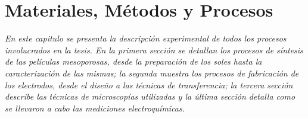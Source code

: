  \newcommand{\NoBiblioMat}[1]{
 \ifthenelse{\equal{#1}{verdadero}}{}{}
 \NoBiblioMat{verdadero}}


 \FormatoCapituloUnaLinea

 \chapter{Materiales, Métodos y Procesos}\label{chap:Materiales}

 \thispagestyle{empty}
	
  \noindent\textit{En este capitulo se presenta la descripción experimental de todos los procesos involucrados en la tesis. En la primera sección se detallan los procesos de síntesis de las películas mesoporosas, desde la preparación de los soles hasta la caracterización de las mismas; la segunda muestra los procesos de fabricación de los electrodos, desde el diseño a las técnicas de transferencia; la tercera sección describe las técnicas de microscopías utilizadas y la última sección detalla como se llevaron a cabo las mediciones electroquímicas.}


 \vfill
 \minitoc
 \newpage


